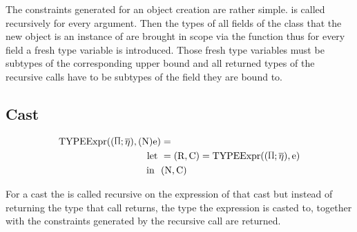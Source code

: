 The constraints generated for an object creation are rather simple.  is called recursively for every argument. Then the types of all
fields of the class that the new object is an instance of are brought in scope via the  function thus for every field a fresh type variable is introduced.
Those fresh type variables must be subtypes of the corresponding upper bound and all returned types of the recursive calls have to be subtypes of the field they are bound to.

\subsection{Cast}

\begin{align*}
    \texpr{(\text{N})\text{e}} &=\\
    \text{let} \ &= (\text{R}, \text{C}) = \texpr{\text{e}}\\
    \text{in} \ \ &(\text{N}, \text{C})
\end{align*}

For a cast the  is called recursive on the expression of that cast but instead of returning the type that call returns, the type the expression is casted to, together with the constraints generated by the recursive call are returned.
